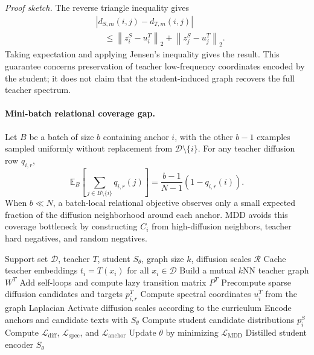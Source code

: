 \emph{Proof sketch.}
The reverse triangle inequality gives
\begin{equation}
\begin{aligned}
&\left|d_{S,m}(i,j)-d_{T,m}(i,j)\right|\\
&\quad\le
\left\|z_i^S-u_i^T\right\|_2
+
\left\|z_j^S-u_j^T\right\|_2.
\end{aligned}
\end{equation}
Taking expectation and applying Jensen's inequality gives the result. This guarantee concerns preservation of teacher low-frequency coordinates encoded by the student; it does not claim that the student-induced graph recovers the full teacher spectrum.

\paragraph{Mini-batch relational coverage gap.}
Let $B$ be a batch of size $b$ containing anchor $i$, with the other $b-1$ examples sampled uniformly without replacement from $\mathcal{D}\setminus\{i\}$. For any teacher diffusion row $q_{i,r}$,
\begin{equation}
    \mathbb{E}_{B}
    \left[
    \sum_{j\in B\setminus\{i\}}q_{i,r}(j)
    \right]
    =
    \frac{b-1}{N-1}
    \left(1-q_{i,r}(i)\right).
\end{equation}
When $b\ll N$, a batch-local relational objective observes only a small expected fraction of the diffusion neighborhood around each anchor. MDD avoids this coverage bottleneck by constructing $C_i$ from high-diffusion neighbors, teacher hard negatives, and random negatives.

\begin{algorithm}[t]
\caption{MDD Training}
\label{alg:mddkd}
\begin{algorithmic}[1]
\REQUIRE Support set $\mathcal{D}$, teacher $T$, student $S_{\theta}$, graph size $k$, diffusion scales $\mathcal{R}$
\STATE Cache teacher embeddings $t_i=T(x_i)$ for all $x_i\in\mathcal{D}$
\STATE Build a mutual $k$NN teacher graph $W^T$
\STATE Add self-loops and compute lazy transition matrix $P^T$
\STATE Precompute sparse diffusion candidates and targets $p_{i,r}^T$
\STATE Compute spectral coordinates $u_i^T$ from the graph Laplacian
    \STATE Activate diffusion scales according to the curriculum
        \STATE Encode anchors and candidate texts with $S_{\theta}$
        \STATE Compute student candidate distributions $p_i^S$
        \STATE Compute $\mathcal{L}_{\mathrm{diff}}$, $\mathcal{L}_{\mathrm{spec}}$, and $\mathcal{L}_{\mathrm{anchor}}$
        \STATE Update $\theta$ by minimizing $\mathcal{L}_{\mathrm{MDD}}$
    \ENDFOR
\ENDFOR
\RETURN Distilled student encoder $S_{\theta}$
\end{algorithmic}
\end{algorithm}
